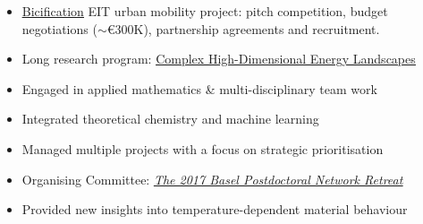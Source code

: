 \documentclass[10pt,a4paper,ragged2e,withhyper]{altacv}
\begin{document}
\begin{paracol}{2}
\begin{itemize}
\item \href{https://bicification-project.eu/}{\underline{Bicification}} EIT urban mobility project: pitch competition, budget negotiations ($\sim$\euro{300K}), partnership agreements and recruitment.
\end{itemize}
\divider

\begin{itemize}
\item Long research program: \href{https://www.ipam.ucla.edu/programs/long-programs/complex-high-dimensional-energy-landscapes/}{\underline{Complex High-Dimensional Energy Landscapes}}
\item Engaged in applied mathematics \& multi-disciplinary team work
\end{itemize}
\divider

\begin{itemize}
\item Integrated theoretical chemistry and machine learning%
\item Managed multiple projects with a focus on strategic prioritisation%
\item Organising Committee: \href{https://postdocretreat.biozentrum.unibas.ch/?page_id=1677}{\underline{\emph{The 2017 Basel Postdoctoral Network Retreat}}}
\end{itemize}
\divider

\begin{itemize}
\item Provided new insights into temperature-dependent material behaviour
\end{itemize}
\divider


\end{paracol}
\end{document}
